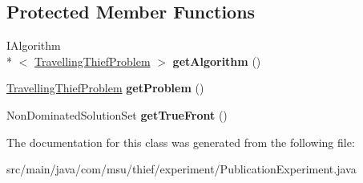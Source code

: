 \subsection*{Protected Member Functions}
\begin{DoxyCompactItemize}
\item 
\hypertarget{classcom_1_1msu_1_1thief_1_1experiment_1_1PublicationExperiment_ada7b8e62d445bfbfab4e0079aed41602}{I\-Algorithm\\*
$<$ \hyperlink{classcom_1_1msu_1_1thief_1_1problems_1_1TravellingThiefProblem}{Travelling\-Thief\-Problem} $>$ {\bfseries get\-Algorithm} ()}\label{classcom_1_1msu_1_1thief_1_1experiment_1_1PublicationExperiment_ada7b8e62d445bfbfab4e0079aed41602}

\item 
\hypertarget{classcom_1_1msu_1_1thief_1_1experiment_1_1PublicationExperiment_af5db78e4e54fe3c728272442c3684ecf}{\hyperlink{classcom_1_1msu_1_1thief_1_1problems_1_1TravellingThiefProblem}{Travelling\-Thief\-Problem} {\bfseries get\-Problem} ()}\label{classcom_1_1msu_1_1thief_1_1experiment_1_1PublicationExperiment_af5db78e4e54fe3c728272442c3684ecf}

\item 
\hypertarget{classcom_1_1msu_1_1thief_1_1experiment_1_1PublicationExperiment_ab227139ff6e3056cd773ffbb3e582ac3}{Non\-Dominated\-Solution\-Set {\bfseries get\-True\-Front} ()}\label{classcom_1_1msu_1_1thief_1_1experiment_1_1PublicationExperiment_ab227139ff6e3056cd773ffbb3e582ac3}

\end{DoxyCompactItemize}


The documentation for this class was generated from the following file\-:\begin{DoxyCompactItemize}
\item 
src/main/java/com/msu/thief/experiment/Publication\-Experiment.\-java\end{DoxyCompactItemize}
